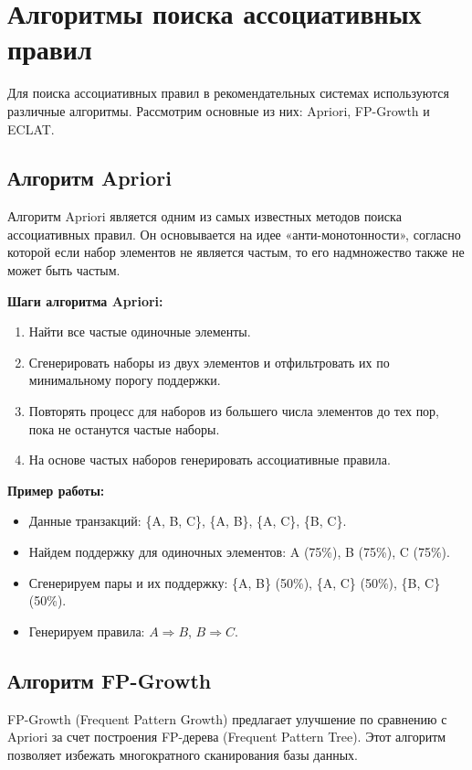 \section{Алгоритмы поиска ассоциативных правил}

Для поиска ассоциативных правил в рекомендательных системах используются различные алгоритмы. Рассмотрим основные из них: Apriori, FP-Growth и ECLAT.

\subsection{Алгоритм Apriori}

Алгоритм Apriori является одним из самых известных методов поиска ассоциативных правил. Он основывается на идее «анти-монотонности», согласно которой если набор элементов не является частым, то его надмножество также не может быть частым.

\textbf{Шаги алгоритма Apriori:}
\begin{enumerate}
    \item Найти все частые одиночные элементы.
    \item Сгенерировать наборы из двух элементов и отфильтровать их по минимальному порогу поддержки.
    \item Повторять процесс для наборов из большего числа элементов до тех пор, пока не останутся частые наборы.
    \item На основе частых наборов генерировать ассоциативные правила.
\end{enumerate}

\textbf{Пример работы:}

\begin{itemize}
    \item Данные транзакций: \{A, B, C\}, \{A, B\}, \{A, C\}, \{B, C\}.
    \item Найдем поддержку для одиночных элементов: A (75\%), B (75\%), C (75\%).
    \item Сгенерируем пары и их поддержку: \{A, B\} (50\%), \{A, C\} (50\%), \{B, C\} (50\%).
    \item Генерируем правила: $A \Rightarrow B$, $B \Rightarrow C$.
\end{itemize}

\subsection{Алгоритм FP-Growth}

FP-Growth (Frequent Pattern Growth) предлагает улучшение по сравнению с Apriori за счет построения FP-дерева (Frequent Pattern Tree). Этот алгоритм позволяет избежать многократного сканирования базы данных.

